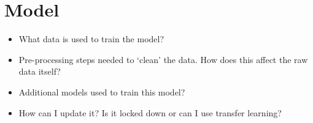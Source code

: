 \section{Model}

\begin{itemize}
  \item What data is used to train the model?
  \item Pre-processing steps needed to `clean' the data. How does this affect the raw data itself?
  \item Additional models used to train this model?
  \item How can I update it? Is it locked down or can I use transfer learning?
\end{itemize}